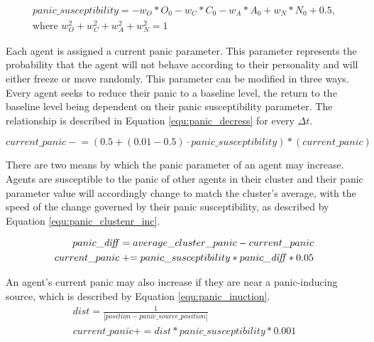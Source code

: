 \documentclass[9pt]{pnas-new}
\begin{document}
\begin{align}
    \label{equ:panic}
    panic\_susceptibility = -w_O * O_0 - w_C* C_0 - w_A* A_0 + w_N *  
    N_0 + 0.5, \\
    \text{where } w_O^2 + w_C^2 + w_A^2 + w_N^2 = 1 \nonumber
\end{align}

Each agent is assigned a current panic parameter. This parameter represents the probability that the agent will not behave according to their personality and will either freeze or move randomly. This parameter can be modified in three ways. Every agent seeks to reduce their panic to a baseline level, the return to the baseline level being dependent on their panic susceptibility parameter. The relationship is described in Equation \ref{equ:panic_decress} for every $\Delta{t}$.

\begin{equation}
    current\_panic \mathrel{-}= (0.5 + (0.01 - 0.5) \cdot panic\_susceptibility) * (current\_panic)
    \label{equ:panic_decress}
\end{equation}

There are two means by which the panic parameter of an agent may increase. Agents are susceptible to the panic of other agents in their cluster and their panic parameter value will accordingly change to match the cluster's average, with the speed of the change governed by their panic susceptibility, as described by Equation \ref{equ:panic_clustenr_inc}. 

\begin{equation}
  \begin{aligned}
    panic\_\text{\textit{diff}} = average\_cluster\_panic - current\_panic \\
    current\_panic \mathrel{+}= panic\_susceptibility * panic\_\text{\textit{diff}} * 0.05
\end{aligned}
    \label{equ:panic_clustenr_inc}
\end{equation}

An agent's current panic may also increase if they are near a panic-inducing source, which is described by Equation \ref{equ:panic_inuction}.
\begin{equation}
    \begin{aligned}
        dist = \frac{1} {|position - panic\_source\_position|} \\
        current\_panic += dist * panic\_susceptibility * 0.001
    \end{aligned}
    \label{equ:panic_inuction}
\end{equation}
\end{document}
